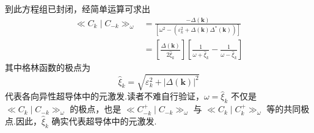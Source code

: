到此方程组已封闭，经简单运算可求出
\begin{equation}
\begin{aligned}
  \ll C_{k}\mid C_{-k}\gg_{\omega}
  &=\frac{-\Delta(\boldsymbol{k})}{\left[\omega^{2}-\left(\varepsilon_{k}^{2}+\Delta(\boldsymbol{k})\Delta^{*}(\boldsymbol{k})\right)\right]}\\
  &=\left[\frac{\Delta(\boldsymbol{k})}{2\hat{\xi}_{k}}\right]
  \left[\frac{1}{\omega+\hat{\xi}_{k}}-\frac{1}{\omega-\hat{\xi}_{k}}\right]
\end{aligned}
\end{equation}
其中格林函数的极点为
\begin{equation}
  \hat{\xi}_{k}=\sqrt{\varepsilon_{k}^{2}+\left|\Delta(\boldsymbol{k})\right|^{2}}
\end{equation}
代表各向异性超导体中的元激发.读者不难自行验证，$\omega=\hat{\xi}_{k}$ 不仅是 $\ll C_{k}\mid C_{-k}\gg_{\omega}$ 的极点，也是 $\ll C^{+}_{-k}\mid C_{-k}\gg_{\omega}$ 与 $\ll C_{k}\mid C^{+}_{k}\gg_{\omega}$ 等的共同极点.因此，$\hat{\xi}_{k}$ 确实代表超导体中的元激发.

